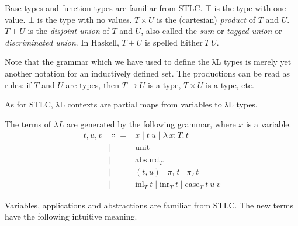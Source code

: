 \documentclass{article}
\theoremstyle{definition}
\newcommand{\Lam}[2]{λ\,#1.\, #2}
\newcommand{\unit}{\mathrm{unit}}
\newcommand{\absurd}{\mathrm{absurd}}
\newcommand{\inl}{\ensuremath{\mathrm{inl}}}
\newcommand{\inr}{\ensuremath{\mathrm{inr}}}
\newcommand{\case}{\mathrm{case}}
\begin{document}
Base types and function types are familiar from STLC.
$⊤$ is the type with one value.
$⊥$ is the type with no values.
$T × U$ is the (cartesian) \emph{product} of $T$ and $U$.
$T + U$ is the \emph{disjoint union} of $T$ and $U$, also called the \emph{sum} or \emph{tagged union} or \emph{discriminated union}.
In Haskell, $T + U$ is spelled $\mathrm{Either}~T~U$.

Note that the grammar which we have used to define the λL types is merely yet another notation for an inductively defined set.
The productions can be read as rules: if $T$ and $U$ are types, then $T → U$ is a type, $T × U$ is a type, etc.

\begin{definition}[Contexts]
  As for STLC, λL contexts are partial maps from variables to λL types.
\end{definition}

\begin{definition}[Terms]
  The terms of $λL$ are generated by the following grammar, where $x$ is a variable.
  \begin{eqnarray*}
    t,u,v &∷=& x \mid t~u \mid \Lam{x : T}{t} \\
          &\mid& \unit \\
          &\mid& \absurd_{T} \\
          &\mid& (t,u) \mid π₁~t \mid π₂~t \\
          &\mid& \inl_{T}~t \mid \inr_{T}~t \mid \case_{T}~t~u~v
  \end{eqnarray*}
\end{definition}

Variables, applications and abstractions are familiar from STLC.
The new terms have the following intuitive meaning.
\end{document}
